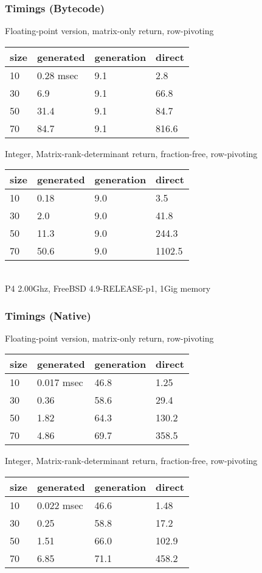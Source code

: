 \documentclass{beamer}
\begin{document}
\begin{frame}
\frametitle{Timings (Bytecode)}
Floating-point version, matrix-only return, row-pivoting

\begin{tabular}{l|l|l|l}
	size & generated & generation & direct \\ \hline
	10 & 0.28 msec & 9.1 & 2.8 \\
	30 & 6.9  & 9.1 & 66.8 \\
	50 & 31.4 & 9.1 & 84.7 \\
	70 & 84.7 & 9.1 & 816.6 \\
\end{tabular}

Integer, Matrix-rank-determinant return, fraction-free, row-pivoting 

\begin{tabular}{l|l|l|l}
	size & generated & generation & direct \\ \hline
	10 & 0.18 & 9.0 & 3.5 \\
	30 & 2.0  & 9.0 & 41.8 \\
	50 & 11.3 & 9.0 & 244.3 \\
	70 & 50.6 & 9.0 & 1102.5 \\
\end{tabular}\\
P4 2.00Ghz, FreeBSD 4.9-RELEASE-p1, 1Gig memory
\end{frame}

\begin{frame}
\frametitle{Timings (Native)}
Floating-point version, matrix-only return, row-pivoting

\begin{tabular}{l|l|l|l}
	size & generated & generation & direct \\ \hline
	10 & 0.017 msec & 46.8 & 1.25 \\
	30 & 0.36       & 58.6 & 29.4 \\
	50 & 1.82       & 64.3 & 130.2 \\
	70 & 4.86       & 69.7 & 358.5 \\
\end{tabular}

Integer, Matrix-rank-determinant return, fraction-free, row-pivoting 

\begin{tabular}{l|l|l|l}
	size & generated & generation & direct \\ \hline
	10 & 0.022 msec & 46.6 & 1.48 \\
	30 & 0.25       & 58.8 & 17.2 \\
	50 & 1.51       & 66.0 & 102.9 \\
	70 & 6.85       & 71.1 & 458.2 \\
\end{tabular}
\end{frame}
\end{document}
